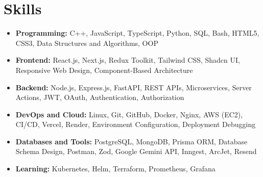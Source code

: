 \documentclass[10pt,a4paper]{article}
\newcommand{\resumeItem}[1]{\item\small #1}
\begin{document}
\section{Skills}
\begin{itemize}[leftmargin=*, topsep=2pt, itemsep=2pt]
  \resumeItem{\textbf{Programming:} C++, JavaScript, TypeScript, Python, SQL, Bash, HTML5, CSS3, Data Structures and Algorithms, OOP}
  \resumeItem{\textbf{Frontend:} React.js, Next.js, Redux Toolkit, Tailwind CSS, Shadcn UI, Responsive Web Design, Component-Based Architecture}
  \resumeItem{\textbf{Backend:} Node.js, Express.js, FastAPI, REST APIs, Microservices, Server Actions, JWT, OAuth, Authentication, Authorization}
  \resumeItem{\textbf{DevOps and Cloud:} Linux, Git, GitHub, Docker, Nginx, AWS (EC2), CI/CD, Vercel, Render, Environment Configuration, Deployment Debugging}
  \resumeItem{\textbf{Databases and Tools:} PostgreSQL, MongoDB, Prisma ORM, Database Schema Design, Postman, Zod, Google Gemini API, Inngest, ArcJet, Resend}
  \resumeItem{\textbf{Learning:} Kubernetes, Helm, Terraform, Prometheus, Grafana}
\end{itemize}
\end{document}
